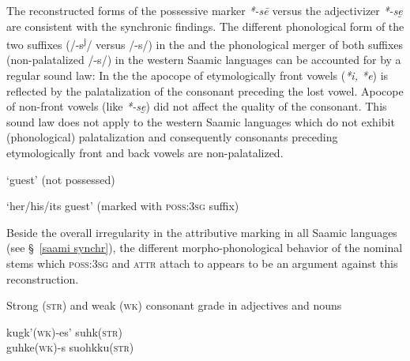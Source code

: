 {The reconstructed  forms of the possessive marker \textit{*-sē} \cite[73]{sammallahti1998b} versus the adjectivizer \textit{*-se̮} are consistent with the synchronic findings. The different phonological form of the two suffixes (/-s\textsuperscript{j}/ versus /-s/) in the  and the phonological merger of both suffixes (non-palatalized /-s/) in the western Saamic languages can be accounted for by a regular sound law: In the  the apocope of etymologically front vowels (\textit{*i, *e}) is reflected by the palatalization of the consonant preceding the lost vowel. Apocope of non-front vowels (like \textit{*-se̮}) did not affect the quality of the consonant. This sound law does not apply to the western Saamic languages which do not exhibit (phonological) palatalization and consequently consonants preceding etymologically front and back vowels are non-palatalized.
\begin{exe}
\settowidth{}
\ex
\begin{xlist}
\ex \rm{‘guest’ (not possessed)}
\begin{xlist}
\end{xlist}
\ex \rm{‘her/his/its guest’ (marked with \textsc{poss:3sg} suffix)}
\begin{xlist}
\end{xlist}
\end{xlist}
\end{exe}
Beside the overall irregularity in the attributive marking in all Saamic languages (see \S~\ref{saami synchr}), the different morpho-phonological behavior of the nominal stems which \textsc{poss:3sg} and \textsc{attr} attach to appears to be an argument against this reconstruction. 
\begin{exe}
\settowidth{}
\ex \rm{Strong (\textsc{str}) and weak (\textsc{wk}) consonant grade in adjectives and nouns}
\begin{xlist}
\ex 
\glll 	kugk'(\textsc{wk})-es' suhk(\textsc{str}) 		\\
	guhke(\textsc{wk})-s suohkku(\textsc{str}) 		\\

\end{xlist}
\end{exe}}
